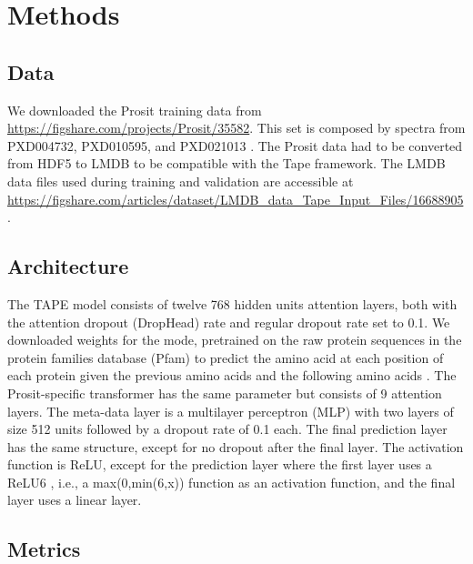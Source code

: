 \documentclass[10pt,a4paper]{article}
\begin{document}
\section*{Methods}
\subsection*{Data}
We downloaded the Prosit training data from \url{https://figshare.com/projects/Prosit/35582}.  This set is composed by spectra from PXD004732, PXD010595, and PXD021013 \cite{Gessulat2019-el, Wilhelm2021-mz}. The Prosit data had to be converted from HDF5 to LMDB to be compatible with the Tape framework. The LMDB data files used during training and validation are accessible at \url{https://figshare.com/articles/dataset/LMDB_data_Tape_Input_Files/16688905}.

\subsection*{Architecture}

The TAPE model consists of twelve 768 hidden units attention layers, both with the attention dropout (DropHead) rate \cite{Zhou2020-ji} and regular dropout rate set to 0.1. We downloaded weights for the mode, pretrained on the raw protein sequences in the protein families database (Pfam) to predict the amino acid at each position of each protein given the previous amino acids and the following amino acids \cite{Rao2019-qq}. The Prosit-specific transformer has the same parameter but consists of 9 attention layers. The meta-data layer is a multilayer perceptron (MLP) with two layers of size 512 units followed by a dropout rate of 0.1 each. The final prediction layer has the same structure, except for no dropout after the final layer.  The activation function is ReLU, except for the prediction layer where the first layer uses a ReLU6 \cite{Howard2017-yv}, i.e., a max(0,min(6,x)) function as an activation function, and the final layer uses a linear layer.

\subsection*{Metrics}
\end{document}
